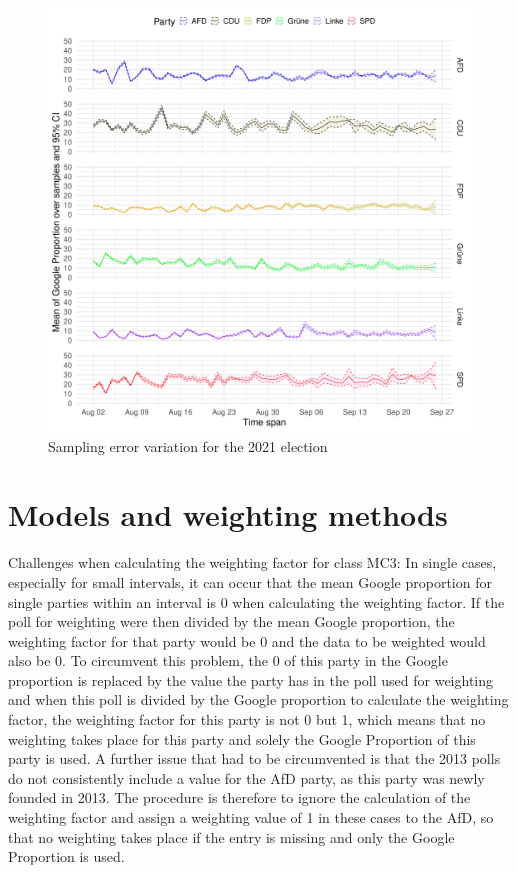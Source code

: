 \documentclass[
  letterpaper,
  DIV=11,
  numbers=noendperiod]{scrartcl}
\begin{document}
\begin{figure}[H]

\caption{\label{fig-A3}Sampling error variation for the 2021 election}

{\centering \includegraphics{figures/fig-A3-1.pdf}

}

\end{figure}

\hypertarget{models-and-weighting-methods}{%
\section{Models and weighting
methods}\label{models-and-weighting-methods}}

Challenges when calculating the weighting factor for class MC3: In
single cases, especially for small intervals, it can occur that the mean
Google proportion for single parties within an interval is 0 when
calculating the weighting factor. If the poll for weighting were then
divided by the mean Google proportion, the weighting factor for that
party would be 0 and the data to be weighted would also be 0. To
circumvent this problem, the 0 of this party in the Google proportion is
replaced by the value the party has in the poll used for weighting and
when this poll is divided by the Google proportion to calculate the
weighting factor, the weighting factor for this party is not 0 but 1,
which means that no weighting takes place for this party and solely the
Google Proportion of this party is used. A further issue that had to be
circumvented is that the 2013 polls do not consistently include a value
for the AfD party, as this party was newly founded in 2013. The
procedure is therefore to ignore the calculation of the weighting factor
and assign a weighting value of 1 in these cases to the AfD, so that no
weighting takes place if the entry is missing and only the Google
Proportion is used.
\end{document}
